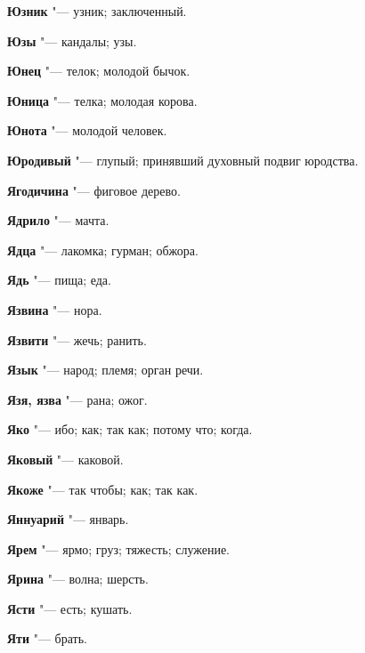 \begin{mymulticols}{2}
\noindent\textbf{Юзник} "--- узник; заключенный. 




\noindent\textbf{Юзы} "--- кандалы; узы. 




\noindent\textbf{Юнец} "--- телок; молодой бычок. 




\noindent\textbf{Юница} "--- телка; молодая корова. 




\noindent\textbf{Юнота} "--- молодой человек. 




\noindent\textbf{Юродивый} "--- глупый; принявший духовный подвиг юродства. 









\noindent\textbf{Ягодичина} "--- фиговое дерево. 




\noindent\textbf{Ядрило} "--- мачта. 




\noindent\textbf{Ядца} "--- лакомка; гурман; обжора. 




\noindent\textbf{Ядь} "--- пища; еда. 




\noindent\textbf{Язвина} "--- нора. 




\noindent\textbf{Язвити} "--- жечь; ранить. 




\noindent\textbf{Язык} "--- народ; племя; орган речи. 




\noindent\textbf{Язя, язва} "--- рана; ожог. 




\noindent\textbf{Яко} "--- ибо; как; так как; потому что; когда. 




\noindent\textbf{Яковый} "--- каковой. 




\noindent\textbf{Якоже} "--- так чтобы; как; так как. 




\noindent\textbf{Яннуарий} "--- январь. 




\noindent\textbf{Ярем} "--- ярмо; груз; тяжесть; служение. 




\noindent\textbf{Ярина} "--- волна; шерсть. 




\noindent\textbf{Ясти} "--- есть; кушать. 




\noindent\textbf{Яти} "--- брать. 
\normalfont\end{mymulticols}
\longpage\mychapterending


 

